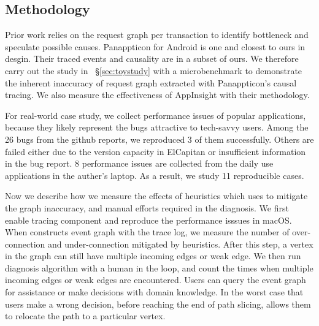 \subsection{Methodology} \label{sec:methodology}


Prior work relies on the request graph per transaction to identify bottleneck
and speculate possible causes. Panappticon for Android is one and closest to
ours in desgin. Their traced events and causality are in a subset of ours.  We
therefore carry out the study in ~\S\ref{sec:toystudy} with a microbenchmark to
demonstrate the inherent inaccuracy of request graph extracted with
Panappticon's causal tracing. We also measure the effectiveness of AppInsight
with their methodology.

For real-world case study, we collect performance issues of popular
applications, because they likely represent the bugs attractive to tech-savvy
users. Among the 26 bugs from the github reports, we reproduced 3 of them
successfully. Others are failed either due to the version capacity in ElCapitan
or insufficient information in the bug report. 8 performance issues are
collected from the daily use applications in the auther's laptop. As a result,
we study 11 reproducible cases. 


Now we describe how we measure the effects of heuristics which \xxx uses to
mitigate the graph inaccuracy, and manual efforts required in the diagnosis. We
first enable tracing component and reproduce the performance isssues in macOS.
When \xxx constructs event graph with the trace log, we measure the number of
over-connection and under-connection mitigated by heuristics. After this step, a
vertex in the graph can still have multiple incoming edges or weak edge. We then
run \xxx diagnosis algorithm with a human in the loop, and count the times when
multiple incoming edges or weak edges are encountered. Users can query the event
graph for assistance or make decisions with domain knowledge. In the worst case
that users make a wrong decision, before reaching the end of path slicing, \xxx
allows them to relocate the path to a particular vertex.

